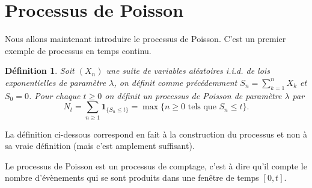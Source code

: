 \documentclass[a4paper,12pt]{book}
\newtheorem{defnfr}[thmfr]{Définition}
\begin{document}
\section{Processus de Poisson}
Nous allons maintenant introduire le processus de Poisson. C'est un premier exemple de processus en temps continu.
\begin{defnfr}
Soit $(X_n)$ une suite de variables aléatoires i.i.d. de lois exponentielles de paramètre $\lambda$, on définit comme précédemment $S_n=\sum_{k=1}^n X_k$ et $S_0=0$.
Pour chaque $t\ge0$ on définit un processus de Poisson de paramètre $\lambda$ par
$$N_t=\sum_{n\geq 1}\mathbf{1}_{\{S_n\leq t\}}=\max \{n\ge0\text{ tels que } S_{n}\leq t\}.$$
\end{defnfr}
La définition ci-dessous correspond en fait à la construction du processus et non à sa vraie définition (mais c'est amplement suffisant).

Le processus de Poisson est un processus de comptage, c'est à dire qu'il compte le nombre d'évènements qui se sont produits dans une fenêtre de temps $[0,t]$.
\end{document}

